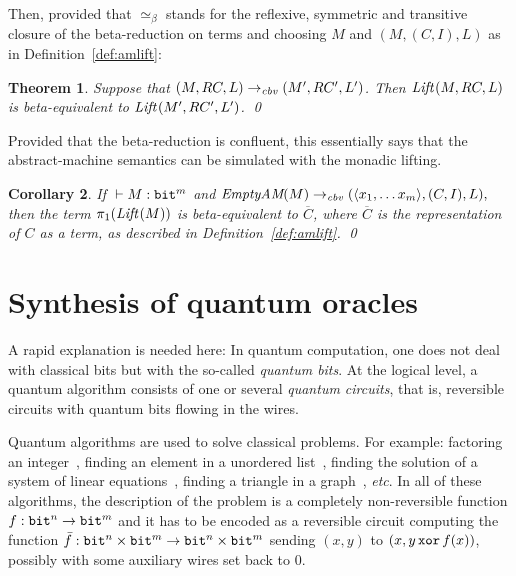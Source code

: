 \documentclass{article}
\theoremstyle{plain}
\newtheorem{theorem}{Theorem}
\newtheorem{corollary}[theorem]{Corollary}
\theoremstyle{definition}
\newcommand{\bit}{{\tt bit}}
\newcommand{\define}[1]{{\em #1}}
\newcommand{\emptyam}{\textrm{{\it EmptyAM}}}
\newcommand{\cbvam}{\mathrel{\to_{\it cbv}}}
\newcommand{\Lift}[1]{{\it Lift}_{\mathcal{#1}}}
\begin{document}
Then, provided that $\simeq_\beta$ stands for the reflexive, symmetric
and transitive closure of the beta-reduction on terms and choosing $M$
and $(M,(C,I),L)$ as in Definition~\ref{def:amlift}:

\begin{theorem}
  Suppose that $(M,RC,L)\cbvam(M',RC',L')$. Then 
  $\Lift{}(M,RC,L)$ is beta-equivalent to $\Lift{}(M',RC',L')$.
  \qed
\end{theorem}

Provided that the beta-reduction is confluent, this essentially says
that the abstract-machine semantics can be simulated with the monadic
lifting.

\begin{corollary}\label{cor}
  If ${}\vdash M:\bit^m$ and 
  $
    \emptyam(M)\cbvam(\prodterm{x_1,\ldots x_m},(C,I),L),
  $
  then the term $\pi_1(\Lift{}(M))$ is beta-equivalent to $\overline{C}$,
  where $\overline{C}$ is the representation of $C$ as a term, as
  described in Definition~\ref{def:amlift}.
  \qed
\end{corollary}




\section{Synthesis of quantum oracles}
\label{sec:use-cases}
\label{sec:reduc-size-circ}

A rapid explanation is needed here: In quantum computation, one does
not deal with classical bits but with the so-called \define{quantum
  bits}. At the logical level, a quantum algorithm consists of one or
several \define{quantum circuits}, that is, reversible circuits with
quantum bits flowing in the wires.

Quantum algorithms are used to solve classical problems. For example:
factoring an integer~\cite{shor}, finding an element in a unordered
list~\cite{grover}, finding the solution of a system of linear
equations~\cite{QLSA}, finding a triangle in a graph~\cite{TF}, {\em etc}.
In all of these algorithms, the description of the problem is a
completely non-reversible function $f:\bit^n \to \bit^m$ and it has to
be encoded as a reversible circuit computing the function
$\bar{f}:\bit^n\times\bit^m \to \bit^n\times\bit^m$ sending $(x,y)$ to
$(x, y\,{\tt xor}\,f(x))$, possibly with some auxiliary wires set back
to $0$.
\end{document}
